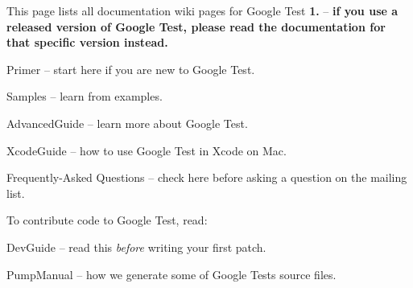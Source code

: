 This page lists all documentation wiki pages for Google Test {\bfseries 1.} -- {\bfseries if you use a released version of Google Test, please read the documentation for that specific version instead.}


\begin{DoxyItemize}
\item Primer -- start here if you are new to Google Test.
\item Samples -- learn from examples.
\item Advanced\+Guide -- learn more about Google Test.
\item Xcode\+Guide -- how to use Google Test in Xcode on Mac.
\item Frequently-\/\+Asked Questions -- check here before asking a question on the mailing list.
\end{DoxyItemize}

To contribute code to Google Test, read\+:


\begin{DoxyItemize}
\item Dev\+Guide -- read this {\itshape before} writing your first patch.
\item Pump\+Manual -- how we generate some of Google Test\textquotesingle{}s source files. 
\end{DoxyItemize}